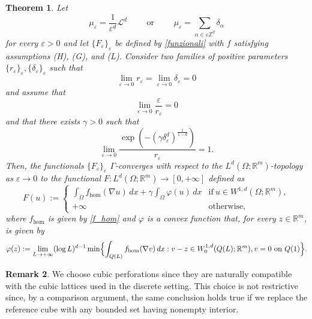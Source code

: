 \documentclass{article}
\theoremstyle{plain}
\newtheorem{theorem}{Theorem}[section]
\theoremstyle{definition}
\newtheorem{remark}[theorem]{Remark}
\def\e{\varepsilon}
\def\rr{{\mathbb R}}
\def\ZZ{{\mathbb Z}}
\newcommand{\f}{\varphi}
\numberwithin{equation}{section}
\begin{document}
\begin{theorem}\label{thm: main discreto} Let 
    \begin{equation*}
 \mu_\e=
        \frac{1}{\e^d}\mathcal{L}^d \qquad \text{ or } \qquad \mu_\e=
        \sum_{\alpha\in \e\ZZ^d}\delta_\alpha
\end{equation*}
 for every $\e>0$ and let $\{F_{\varepsilon}\}_\e$ be defined by \eqref{funzionali} with $f$ satisfying assumptions {\rm (H), (G)}, and {\rm (L)}. Consider two families of positive parameters $\{r_\e\}_\e,\{\delta_\e\}_\e$ such that 
 \begin{equation*}
     \lim_{\e\to0}r_\e= \lim_{\e\to0}\delta_\e=0
 \end{equation*}
and assume that 
\begin{equation*}
    \lim_{\e\to0}\frac{\e}{r_{\e}}=0
\end{equation*}
and that there exists $\gamma>0$ such that
\begin{equation*}
    \lim_{\e\to0} \frac{\exp(-(\gamma\delta_\e^d)^\frac{1}{1-d})}{r_\e}=1.
\end{equation*}
Then, the functionals $\{F_{\varepsilon}\}_\e$ $\Gamma$-converges with respect to the $L^{d}(\Omega;\mathbb{R}^{m})$-topology as $\e\to0$ to the functional $F:L^d(\Omega;\mathbb{R}^{m})\rightarrow [0,+\infty]$ defined as 
\begin{equation}\label{main Gamma}
    F(u):=
        \begin{cases}
            \displaystyle
            \int_{\Omega}f_{\hom}(\nabla u)\, dx+\gamma\int_\Omega\f(u)\, dx &\text{if}\ u \in W^{1,d}(\Omega;\mathbb{R}^m),\\
            +\infty &\text {otherwise},
        \end{cases}
    \end{equation}
    where $f_{\hom}$ is given by \eqref{f_hom} and $\f$ is a convex function that, for every $z\in\rr^m$, is given by
\begin{equation}\label{phi}
    \f(z):=\lim_{L\to+\infty}(\log L)^{d-1}\min\Bigl\{ \int_{Q(L)}f_{\rm hom}(\nabla v)\, dx : v-z\in W^{1,d}_0(Q(L);\mathbb{R}^m), v= 0 \text{ on } Q(1)\Bigr\}.
\end{equation}
\end{theorem}

\begin{remark}
We choose cubic perforations since they are naturally compatible with the cubic lattices used in the discrete setting. This choice is not restrictive since, by a comparison argument, the same conclusion holds true if we replace the reference cube with any bounded set having nonempty interior.    
\end{remark}
\end{document}
